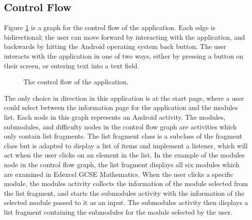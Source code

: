 \documentclass{article}
\begin{document}
\subsection{Control Flow}

Figure \ref{figure:applicationControlFlow} is a graph for the control flow of the application. Each edge is bidirectional; the user can move forward by interacting with the application, and backwards by hitting the Android operating system back button. The user interacts with the application in one of two ways, either by pressing a button on their screen, or entering text into a text field. \par

\begin{figure}[H]
	\centering
	\caption{The control flow of the application.}
	\label{figure:applicationControlFlow}
\end{figure}

The only choice in direction in this application is at the start page, where a user could select between the information page for the application and the modules list. Each node in this graph represents an Android activity. The modules, submodules, and difficulty nodes in the control flow graph are activities which only contain list fragments. The list fragment class is a subclass of the fragment class but is adapted to display a list of items and implement a listener, which will act when the user clicks on an element in the list. In the example of the modules node in the control flow graph, the list fragment displays all six modules which are examined in Edexcel GCSE Mathematics. When the user clicks a specific module, the modules activity collects the information of the module selected from the list fragment, and starts the submodules activity with the information of the selected module passed to it as an input. The submodules activity then displays a list fragment containing the submodules for the module selected by the user. \par
\end{document}
